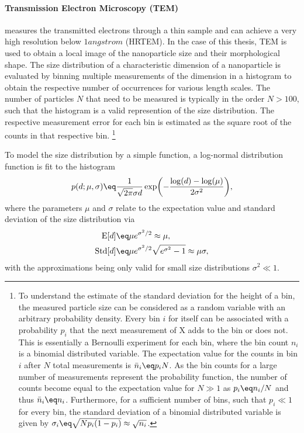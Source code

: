 \documentclass[\main/dresen_thesis.tex]{subfiles}
\begin{document}
    \paragraph{Transmission Electron Microscopy (TEM)}
      measures the transmitted electrons through a thin sample and can achieve a very high resolution below $1 \unit{angstrom}$ (HRTEM).
      In the case of this thesis, TEM is used to obtain a local image of the nanoparticle size and their morphological shape.
      The size distribution of a characteristic dimension of a nanoparticle is evaluated by binning multiple measurements of the dimension in a histogram to obtain the respective number of occurrences for various length scales.
      The number of particles $N$ that need to be measured is typically in the order $N > 100$, such that the histogram is a valid represention of the size distribution.
      The respective measurement error for each bin is estimated as the square root of the counts in that respective bin. \footnote{To understand the estimate of the standard deviation for the height of a bin, the measured particle size can be considered as a random variable with an arbitrary probability density.
      Every bin $i$ for itself can be associated with a probability $p_i$ that the next measurement of X adds to the bin or does not.
      This is essentially a Bernoulli experiment for each bin, where the bin count $n_i$ is a binomial distributed variable.
      The expectation value for the counts in bin $i$ after $N$ total measurements is $\bar{n}_i \eq p_i N$.
      As the bin counts for a large number of measurements represent the probability function, the number of counts become equal to the expectation value for $N \gg 1$ as $p_i \eq n_i / N$ and thus $\bar{n}_i \eq n_i$.
      Furthermore, for a sufficient number of bins, such that $p_i \ll 1$ for every bin, the standard deviation of a binomial distributed variable is given by $\sigma_i \eq \sqrt{N p_i (1-p_i)} \approx \sqrt{n_i}$.}

      To model the size distribution by a simple function, a log-normal distribution function is fit to the histogram
      \begin{align}\label{eq:looselyPackedNP:nanoparticle:lognormalDist}
        p(d; \mu, \sigma) \eq \frac{1}{\sqrt{2\pi} \sigma d} \exp \biggl( - \frac{\log(d) - \log(\mu)}{2 \sigma^2} \biggr),
      \end{align}
      where the parameters $\mu$ and $\sigma$ relate to the expectation value and standard deviation of the size distribution via
      \begin{align}
        \mathrm{E}[d] \eq& \mu e^{\sigma^2/2} \approx \mu,\\
        \mathrm{Std}[d] \eq& \mu e^{\sigma^2/2} \sqrt{e^{\sigma^2} - 1} \approx \mu \sigma,\\
      \end{align}
      with the approximations being only valid for small size distributions $\sigma^2 \ll 1$.
\end{document}
